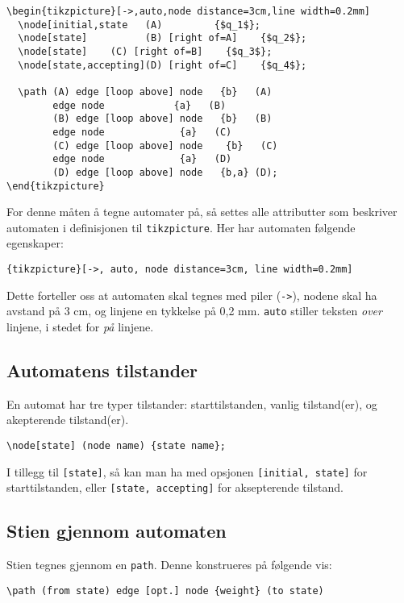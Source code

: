 \documentclass[11pt, a4paper]{article}
\begin{document}
\begin{Verbatim}[fontsize=\small, frame=single]
\begin{tikzpicture}[->,auto,node distance=3cm,line width=0.2mm]
  \node[initial,state   (A) 		{$q_1$};
  \node[state]          (B) [right of=A]    {$q_2$};
  \node[state]	  (C) [right of=B]    {$q_3$};
  \node[state,accepting](D) [right of=C]    {$q_4$};

  \path (A) edge [loop above] node 	 {b}   (A)
	    edge node      		 {a}   (B)
        (B) edge [loop above] node 	 {b}   (B)
	    edge node   	  	  {a}   (C)
        (C) edge [loop above] node	  {b}   (C)
	    edge node 	    	  {a}   (D)
        (D) edge [loop above] node 	 {b,a} (D);
\end{tikzpicture}
\end{Verbatim}
For denne måten å tegne automater på, så settes alle attributter som beskriver automaten i definisjonen til \texttt{tikzpicture}. 
Her har automaten følgende egenskaper:
\begin{center}
\texttt{\{tikzpicture\}[->, auto, node distance=3cm, line width=0.2mm]}
\end{center}
Dette forteller oss at automaten skal tegnes med piler (\texttt{->}), nodene skal ha avstand på 3 cm, og linjene en tykkelse på 0,2 mm. \texttt{auto} stiller teksten \textit{over} linjene, i stedet for \textit{på} linjene.

\subsection{Automatens tilstander} En automat har tre typer tilstander: starttilstanden, vanlig tilstand(er), og akepterende tilstand(er).

\begin{Verbatim}[fontsize=\small]
\node[state] (node name) {state name};
\end{Verbatim}

I tillegg til \texttt{[state]}, så kan man ha med opsjonen \texttt{[initial, state]} for starttilstanden, eller \texttt{[state, accepting]} for aksepterende tilstand.

\subsection{Stien gjennom automaten}
Stien tegnes gjennom en \texttt{path}. Denne konstrueres på følgende vis:

\begin{Verbatim}[fontsize=\small]
\path (from state) edge [opt.] node {weight} (to state)
\end{Verbatim}
\end{document}
